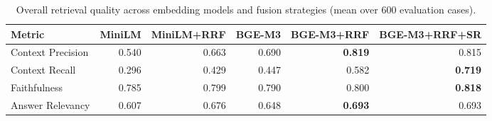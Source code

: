 \begin{table}[htbp]
\centering
\caption{Overall retrieval quality across embedding models and fusion strategies (mean over 600 evaluation cases).}
\label{tab:compare-overall}
\begin{tabular}{lrrrrr}
\toprule
Metric & MiniLM & MiniLM+RRF & BGE-M3 & BGE-M3+RRF & BGE-M3+RRF+SR \\
\midrule
Context Precision & 0.540 & 0.663 & 0.690 & \textbf{0.819} & 0.815 \\
Context Recall & 0.296 & 0.429 & 0.447 & 0.582 & \textbf{0.719} \\
Faithfulness & 0.785 & 0.799 & 0.790 & 0.800 & \textbf{0.818} \\
Answer Relevancy & 0.607 & 0.676 & 0.648 & \textbf{0.693} & 0.693 \\
\bottomrule
\end{tabular}
\end{table}